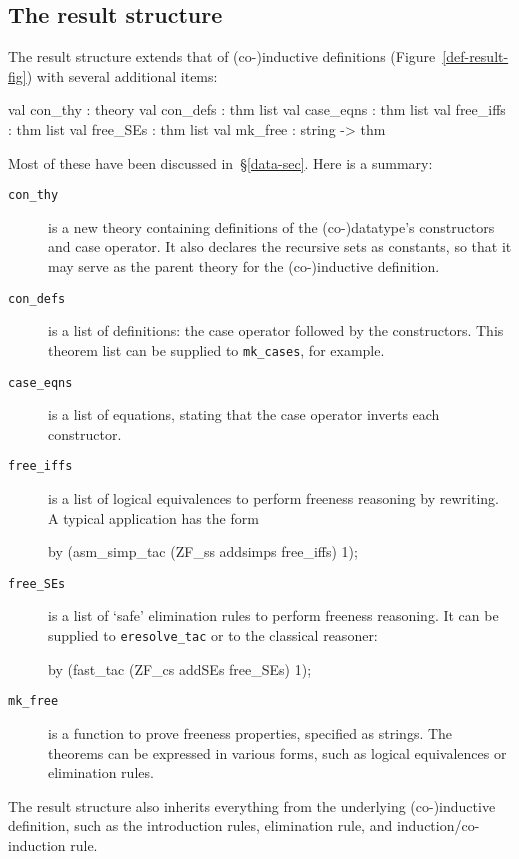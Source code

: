 \subsection{The result structure}
The result structure extends that of (co-)inductive definitions
(Figure~\ref{def-result-fig}) with several additional items:
\begin{ttbox}
val con_thy   : theory
val con_defs  : thm list
val case_eqns : thm list
val free_iffs : thm list
val free_SEs  : thm list
val mk_free   : string -> thm
\end{ttbox}
Most of these have been discussed in~\S\ref{data-sec}.  Here is a summary:
\begin{description}
\item[\tt con\_thy] is a new theory containing definitions of the
(co-)datatype's constructors and case operator.  It also declares the
recursive sets as constants, so that it may serve as the parent
theory for the (co-)inductive definition.

\item[\tt con\_defs] is a list of definitions: the case operator followed by
the constructors.  This theorem list can be supplied to \verb|mk_cases|, for
example.

\item[\tt case\_eqns] is a list of equations, stating that the case operator
inverts each constructor.

\item[\tt free\_iffs] is a list of logical equivalences to perform freeness
reasoning by rewriting.  A typical application has the form
\begin{ttbox}
by (asm_simp_tac (ZF_ss addsimps free_iffs) 1);
\end{ttbox}

\item[\tt free\_SEs] is a list of `safe' elimination rules to perform freeness
reasoning.  It can be supplied to \verb|eresolve_tac| or to the classical
reasoner:
\begin{ttbox} 
by (fast_tac (ZF_cs addSEs free_SEs) 1);
\end{ttbox}

\item[\tt mk\_free] is a function to prove freeness properties, specified as
strings.  The theorems can be expressed in various forms, such as logical
equivalences or elimination rules.
\end{description}

The result structure also inherits everything from the underlying
(co-)inductive definition, such as the introduction rules, elimination rule,
and induction/co-induction rule.


